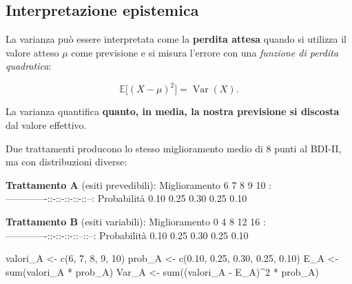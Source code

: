 \documentclass[
  italian,
  letterpaper,
  a4paper,
  11pt,
  open=any]{scrbook}
\newenvironment{Shaded}{\begin{snugshade}}{\end{snugshade}}
\newcommand{\DecValTok}[1]{\textcolor[rgb]{0.68,0.00,0.00}{#1}}
\newcommand{\FloatTok}[1]{\textcolor[rgb]{0.68,0.00,0.00}{#1}}
\newcommand{\FunctionTok}[1]{\textcolor[rgb]{0.28,0.35,0.67}{#1}}
\newcommand{\NormalTok}[1]{\textcolor[rgb]{0.00,0.23,0.31}{#1}}
\newcommand{\OtherTok}[1]{\textcolor[rgb]{0.00,0.23,0.31}{#1}}
\newcommand{\SpecialCharTok}[1]{\textcolor[rgb]{0.37,0.37,0.37}{#1}}
\theoremstyle{plain}
\theoremstyle{definition}
\theoremstyle{definition}
\theoremstyle{remark}
\begin{document}
\subsection{Interpretazione
epistemica}\label{interpretazione-epistemica-1}

La varianza può essere interpretata come la \textbf{perdita attesa}
quando si utilizza il valore atteso \(\mu\) come previsione e si misura
l'errore con una \emph{funzione di perdita quadratica}:

\[
\mathbb{E}\big[(X - \mu)^2\big] = \operatorname{Var}(X).
\]

La varianza quantifica \textbf{quanto, in media, la nostra previsione si
discosta} dal valore effettivo.

\begin{tcolorbox}[enhanced jigsaw, arc=.35mm, bottomrule=.15mm, bottomtitle=1mm, breakable, colback=white, colbacktitle=quarto-callout-note-color!10!white, colframe=quarto-callout-note-color-frame, coltitle=black, left=2mm, leftrule=.75mm, opacityback=0, opacitybacktitle=0.6, rightrule=.15mm, title=\textcolor{quarto-callout-note-color}{\faInfo}\hspace{0.5em}{Esempio: confronto tra due trattamenti}, titlerule=0mm, toprule=.15mm, toptitle=1mm]

Due trattamenti producono lo stesso miglioramento medio di 8 punti al
BDI-II, ma con distribuzioni diverse:

\textbf{Trattamento A} (esiti prevedibili): \textbar{} Miglioramento
\textbar{} 6 \textbar{} 7 \textbar{} 8 \textbar{} 9 \textbar{} 10
\textbar{}
\textbar:-------------:\textbar:-:\textbar:-:\textbar:-:\textbar:-:\textbar:--:\textbar{}
\textbar{} Probabilità \textbar{} 0.10 \textbar{} 0.25 \textbar{} 0.30
\textbar{} 0.25 \textbar{} 0.10 \textbar{}

\textbf{Trattamento B} (esiti variabili): \textbar{} Miglioramento
\textbar{} 0 \textbar{} 4 \textbar{} 8 \textbar{} 12 \textbar{} 16
\textbar{}
\textbar:-------------:\textbar:-:\textbar:-:\textbar:-:\textbar:--:\textbar:--:\textbar{}
\textbar{} Probabilità \textbar{} 0.10 \textbar{} 0.25 \textbar{} 0.30
\textbar{} 0.25 \textbar{} 0.10 \textbar{}

\begin{Shaded}
\begin{Highlighting}[]
\NormalTok{valori\_A }\OtherTok{\textless{}{-}} \FunctionTok{c}\NormalTok{(}\DecValTok{6}\NormalTok{, }\DecValTok{7}\NormalTok{, }\DecValTok{8}\NormalTok{, }\DecValTok{9}\NormalTok{, }\DecValTok{10}\NormalTok{)}
\NormalTok{prob\_A }\OtherTok{\textless{}{-}} \FunctionTok{c}\NormalTok{(}\FloatTok{0.10}\NormalTok{, }\FloatTok{0.25}\NormalTok{, }\FloatTok{0.30}\NormalTok{, }\FloatTok{0.25}\NormalTok{, }\FloatTok{0.10}\NormalTok{)}
\NormalTok{E\_A }\OtherTok{\textless{}{-}} \FunctionTok{sum}\NormalTok{(valori\_A }\SpecialCharTok{*}\NormalTok{ prob\_A)}
\NormalTok{Var\_A }\OtherTok{\textless{}{-}} \FunctionTok{sum}\NormalTok{((valori\_A }\SpecialCharTok{{-}}\NormalTok{ E\_A)}\SpecialCharTok{\^{}}\DecValTok{2} \SpecialCharTok{*}\NormalTok{ prob\_A)}


\end{Highlighting}
\end{Shaded}
\end{tcolorbox}
\end{document}
